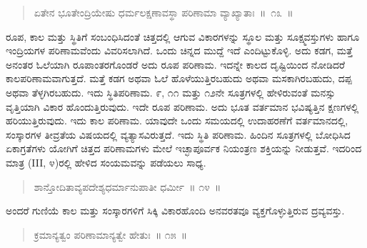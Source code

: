 \begin{verse}
ಏತೇನ ಭೂತೇಂದ್ರಿಯೇಷು ಧರ್ಮಲಕ್ಷಣಾವಸ್ಥಾ ಪರಿಣಾಮಾ ವ್ಯಾಖ್ಯಾತಾಃ~॥~೧೩~॥
\end{verse}

\vspace{-0.3cm}


\vskip 0.2cm

ರೂಪ, ಕಾಲ ಮತ್ತು ಸ್ಥಿತಿಗೆ ಸಂಬಂಧಿಸಿದಂತೆ ಚಿತ್ತದಲ್ಲಿ ಆಗುವ ವಿಕಾರಗಳನ್ನು ಸ್ಥೂಲ ಮತ್ತು ಸೂಕ್ಷ್ಮವಸ್ತುಗಳು ಹಾಗೂ ಇಂದ್ರಿಯಗಳ ಪರಿಣಾಮವೆಂದು ವಿವರಿಸಲಾಗಿದೆ. ಒಂದು ಚಿನ್ನದ ಮುದ್ದೆ ಇದೆ ಎಂದಿಟ್ಟುಕೊಳ್ಳಿ. ಅದು ಕಡಗ, ಮತ್ತೆ ಅನಂತರ ಓಲೆಯಾಗಿ ರೂಪಾಂತರಗೊಂಡರೆ ಅದು ರೂಪ ಪರಿಣಾಮ. ಇದನ್ನೇ ಕಾಲದ ದೃಷ್ಟಿಯಿಂದ ನೋಡಿದರೆ ಕಾಲಪರಿಣಾಮವಾಗುತ್ತದೆ. ಮತ್ತೆ ಕಡಗ ಅಥವಾ ಓಲೆ ಹೊಳೆಯುತ್ತಿರಬಹುದು ಅಥವಾ ಮಸಕಾಗಿರಬಹುದು, ದಪ್ಪ ಅಥವಾ ತೆಳ್ಳಗಿರಬಹುದು. ಇದು ಸ್ಥಿತಿಪರಿಣಾಮ. ೯, ೧೧ ಮತ್ತು ೧೨ನೇ ಸೂತ್ರಗಳಲ್ಲಿ ಹೇಳಿರುವಂತೆ ಮನಸ್ಸು ವೃತ್ತಿಯಾಗಿ ವಿಕಾರ ಹೊಂದುತ್ತಿರುವುದು. ಇದೇ ರೂಪ ಪರಿಣಾಮ. ಅದು ಭೂತ ವರ್ತಮಾನ ಭವಿಷ್ಯತ್ತಿನ ಕ್ಷಣಗಳಲ್ಲಿ ಹರಿಯುತ್ತಿರುವುದು. ಇದು ಕಾಲ ಪರಿಣಾಮ. ಯಾವುದೇ ಒಂದು ಸಮಯದಲ್ಲಿ ಉದಾಹರಣೆಗೆ ವರ್ತಮಾನದಲ್ಲಿ, ಸಂಸ್ಕಾರಗಳ ತೀವ್ರತೆಯ ವಿಷಯದಲ್ಲಿ ವ್ಯತ್ಯಾಸವಿರುತ್ತದೆ. ಇದು ಸ್ಥಿತಿ ಪರಿಣಾಮ. ಹಿಂದಿನ ಸೂತ್ರಗಳಲ್ಲಿ ಬೋಧಿಸಿದ ಏಕಾಗ್ರತೆಗಳು ಯೋಗಿಗೆ ಚಿತ್ತದ ಪರಿಣಾಮಗಳು ಮೇಲೆ ಇಚ್ಛಾಪೂರ್ವಕ ನಿಯಂತ್ರಣ ಶಕ್ತಿಯನ್ನು ನೀಡುತ್ತವೆ. ಇದರಿಂದ ಮಾತ್ರ (III, ೪)ರಲ್ಲಿ ಹೇಳಿದ ಸಂಯಮವನ್ನು ಪಡೆಯಲು ಸಾಧ್ಯ. 

\vspace{-0.3cm}

\begin{verse}
ಶಾನ್ತೋದಿತಾವ್ಯಪದೇಶ್ಯಧರ್ಮಾನುಪಾತೀ ಧರ್ಮೀ~॥ ೧೪~॥
\end{verse}

\vspace{-0.3cm}


\vskip 0.2cm

ಅಂದರೆ ಗುಣಿಯೆ ಕಾಲ ಮತ್ತು ಸಂಸ್ಕಾರಗಳಿಗೆ ಸಿಕ್ಕಿ ವಿಕಾರಹೊಂದಿ ಅನವರತವೂ ವ್ಯಕ್ತಗೊಳ್ಳುತ್ತಿರುವ ದ್ರವ್ಯವಸ್ತು. 

\vspace{-0.3cm}

\begin{verse}
ಕ್ರಮಾನ್ಯತ್ವಂ ಪರಿಣಾಮಾನ್ಯತ್ವೇ ಹೇತುಃ~॥ ೧೫~॥
\end{verse}

\vspace{-0.3cm}


\vspace{-0.3cm}


